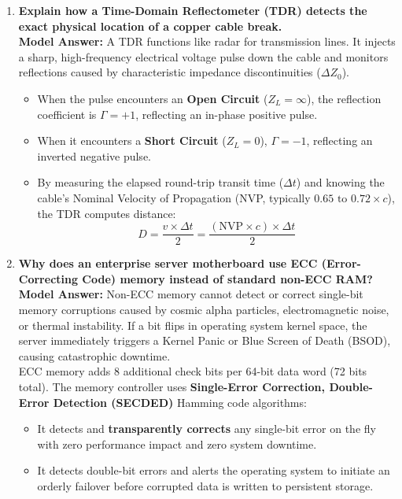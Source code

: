 \begin{enumerate}[leftmargin=*,label=\textbf{Q\arabic*.}]
    \item \textbf{Explain how a Time-Domain Reflectometer (TDR) detects the exact physical location of a copper cable break.} \\
    \textbf{Model Answer:} A TDR functions like radar for transmission lines. It injects a sharp, high-frequency electrical voltage pulse down the cable and monitors reflections caused by characteristic impedance discontinuities ($\Delta Z_0$).
    \begin{itemize}
        \item When the pulse encounters an \textbf{Open Circuit} ($Z_L = \infty$), the reflection coefficient is $\Gamma = +1$, reflecting an in-phase positive pulse.
        \item When it encounters a \textbf{Short Circuit} ($Z_L = 0$), $\Gamma = -1$, reflecting an inverted negative pulse.
        \item By measuring the elapsed round-trip transit time ($\Delta t$) and knowing the cable's Nominal Velocity of Propagation (NVP, typically $0.65\text{ to }0.72\times c$), the TDR computes distance:
        \[
        D = \frac{v \times \Delta t}{2} = \frac{(\text{NVP} \times c) \times \Delta t}{2}
        \]
    \end{itemize}

    \item \textbf{Why does an enterprise server motherboard use ECC (Error-Correcting Code) memory instead of standard non-ECC RAM?} \\
    \textbf{Model Answer:} Non-ECC memory cannot detect or correct single-bit memory corruptions caused by cosmic alpha particles, electromagnetic noise, or thermal instability. If a bit flips in operating system kernel space, the server immediately triggers a Kernel Panic or Blue Screen of Death (BSOD), causing catastrophic downtime. \\
    ECC memory adds 8 additional check bits per 64-bit data word (72 bits total). The memory controller uses \textbf{Single-Error Correction, Double-Error Detection (SECDED)} Hamming code algorithms:
    \begin{itemize}
        \item It detects and \textbf{transparently corrects} any single-bit error on the fly with zero performance impact and zero system downtime.
        \item It detects double-bit errors and alerts the operating system to initiate an orderly failover before corrupted data is written to persistent storage.
    \end{itemize}


\end{enumerate}
